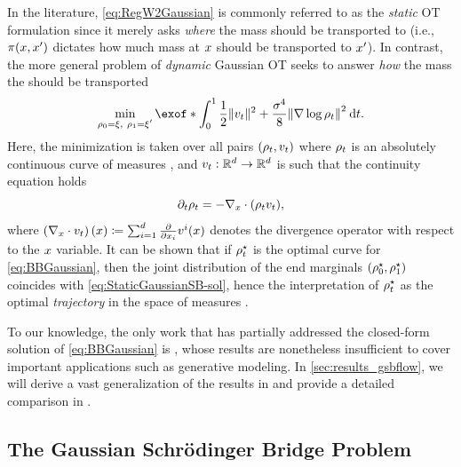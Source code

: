 In the literature, \eqref{eq:RegW2Gaussian} is commonly referred to as the \emph{static} \acrshort{OT} formulation since it merely asks \emph{where} the mass should be transported to (i.e., $\pi(x,x')$ dictates how much mass at $x$ should be transported to $x'$). In contrast, the more general problem of \emph{dynamic} Gaussian \acrshort{OT} seeks to answer \emph{how} the mass the should be transported
\begin{align}
\label{eq:BBGaussian}
\min_{\ssstyle\substack{{\measure[0] = \xi,\ \measure[\horizon] = \xi'}}} \exof*{\int_{0}^\horizon  \frac{1}{2} \norm{\vect}^2 + \frac{\sigma^4}{8} \norm*{\nabla\log\measure}^2 \dt}.
\end{align}Here, the minimization is taken over all pairs $(\rho_{t}, v_t)$ where $\rho_{t}$ is an absolutely continuous curve of measures \citep{ambrosio2006gradient}, and $v_t:\mathbb{R}^d\to\mathbb{R}^d$ is such that the continuity equation holds
\begin{equation}
\label{eq:Coneq}
\partial_{t}\rho_{t} = - \nabla_{ {x} } \cdot(\rho_{t} v_t),
\end{equation}
where $\left(\nabla_{ {x} } \cdot v_t\right)(x) \coloneqq \sum_{i=1}^d \frac{\partial}{\partial x_i}v^{i}(x)$ denotes the divergence operator with respect to the $x$ variable. It can be shown that if $\rho_{t}^\star$ is the optimal curve for \eqref{eq:BBGaussian}, then the joint distribution of the end marginals $(\rho^\star_0, \rho_1^\star)$ coincides with \eqref{eq:StaticGaussianSB-sol}, hence the interpretation of $\rho_{t}^\star$ as the optimal \emph{trajectory} in the space of measures  \citep{chen2016relation, gentil2017analogy, chen2021stochastic, gentil2020dynamical}.

To our knowledge, the only work that has partially addressed the closed-form solution of \eqref{eq:BBGaussian} is \citet{mallasto2021entropy}, whose results are nonetheless insufficient to cover important applications such as generative modeling. In \cref{sec:results_gsbflow}, we will derive a vast generalization of the results in \citet{mallasto2021entropy} and provide a detailed comparison in .


\subsection{The Gaussian Schr{\"o}dinger Bridge Problem}
\label{sec:overview_gsbflow}


